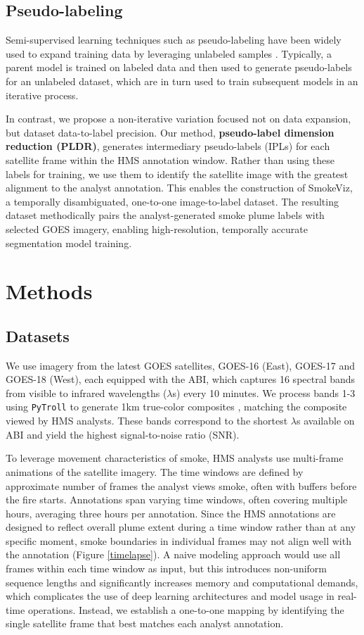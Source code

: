 \documentclass{article}
\begin{document}
\subsection{Pseudo-labeling}

Semi-supervised learning techniques such as pseudo-labeling have been widely used to expand training data by leveraging unlabeled samples \cite{pseudo}. Typically, a parent model is trained on labeled data and then used to generate pseudo-labels for an unlabeled dataset, which are in turn used to train subsequent models in an iterative process.

In contrast, we propose a non-iterative variation focused not on data expansion, but dataset data-to-label precision. Our method, \textbf{pseudo-label dimension reduction (PLDR)}, generates intermediary pseudo-labels (IPLs) for each satellite frame within the HMS annotation window. Rather than using these labels for training, we use them to identify the satellite image with the greatest alignment to the analyst annotation. This enables the construction of SmokeViz, a temporally disambiguated, one-to-one image-to-label dataset. The resulting dataset methodically pairs the analyst-generated smoke plume labels with selected GOES imagery, enabling high-resolution, temporally accurate segmentation model training.


\section{Methods}
\subsection{Datasets}

We use imagery from the latest GOES satellites, GOES-16 (East), GOES-17 and GOES-18 (West), each equipped with the ABI, which captures 16 spectral bands from visible to infrared wavelengths (\(\lambda\)s) every 10 minutes. We process bands 1-3 using \texttt{PyTroll} \cite{satpy} to generate 1km true-color composites \cite{true_color}, matching the composite viewed by HMS analysts. These bands correspond to the shortest \(\lambda\)s available on ABI and yield the highest signal-to-noise ratio (SNR).

To leverage movement characteristics of smoke, HMS analysts use multi-frame animations of the satellite imagery. The time windows are defined by  approximate number of frames the analyst views smoke, often with buffers before the fire starts. Annotations span varying time windows, often covering multiple hours, averaging three hours per annotation. Since the HMS annotations are designed to reflect overall plume extent during a time window rather than at any specific moment, smoke boundaries in individual frames may not align well with the annotation (Figure \ref{timelapse}). A naive modeling approach would use all frames within each time window as input, but this introduces non-uniform sequence lengths and significantly increases memory and computational demands, which complicates the use of deep learning architectures and model usage in real-time operations. Instead, we establish a one-to-one mapping by identifying the single satellite frame that best matches each analyst annotation.
\end{document}
